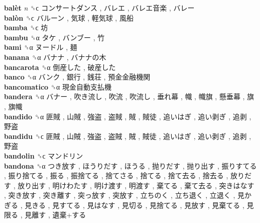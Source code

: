 \textbf{balèt} \emph{n}  ␝ϲ   コンサートダンス ,  バレエ ,  バレエ音楽 ,  バレー   \\
\textbf{balòn} ␝ϲ   バルーン ,  気球 ,  軽気球 ,  風船   \\
\textbf{bamba} ␝ϲ   坊   \\
\textbf{bambu} ␝α   タケ ,  バンブー ,  竹   \\
\textbf{bami} ␝α   ヌードル ,  麺   \\
\textbf{banana} ␝α   バナナ ,  バナナの木   \\
\textbf{bancarota} ␝α   倒産した ,  破産した   \\
\textbf{banco} ␝α   バンク ,  銀行 ,  銭荘 ,  預金金融機関   \\
\textbf{bancomatico} ␝α   現金自動支払機   \\
\textbf{bandera} ␝α   バナー ,  吹き流し ,  吹流 ,  吹流し ,  垂れ幕 ,  幟 ,  幟旗 ,  懸垂幕 ,  旗 ,  旗幟   \\
\textbf{bandido} ␝α   匪賊 ,  山賊 ,  強盗 ,  盗賊 ,  賊 ,  賊徒 ,  追いはぎ ,  追い剥ぎ ,  追剥 ,  野盗   \\
\textbf{bandidu} ␝ϲ   匪賊 ,  山賊 ,  強盗 ,  盗賊 ,  賊 ,  賊徒 ,  追いはぎ ,  追い剥ぎ ,  追剥 ,  野盗   \\
\textbf{bandolin} ␝ϲ   マンドリン   \\
\textbf{bandona} ␝α   つき放す ,  ほうりだす ,  ほうる ,  抛りだす ,  抛り出す ,  振りすてる ,  振り捨てる ,  振る ,  振捨てる ,  捨てさる ,  捨てる ,  捨て去る ,  捨去る ,  放りだす ,  放り出す ,  明けわたす ,  明け渡す ,  明渡す ,  棄てる ,  棄て去る ,  突きはなす ,  突き放す ,  突き離す ,  突っ放す ,  突放す ,  立ちのく ,  立ち退く ,  立退く ,  見かぎる ,  見きる ,  見すてる ,  見はなす ,  見切る ,  見捨てる ,  見放す ,  見棄てる ,  見限る ,  見離す ,  遺棄+する   \\
